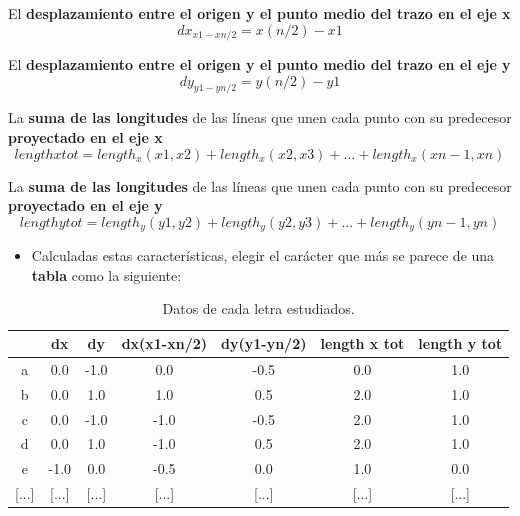 El \textbf{desplazamiento entre el origen y el punto medio del trazo en el eje x}
\begin{equation}
 dx_{x1-xn/2}=x(n/2)-x1
\end{equation}

El \textbf{desplazamiento entre el origen y el punto medio del trazo en el eje y}
\begin{equation}
dy _{y1-yn/2}=y(n/2)-y1
\end{equation}

La \textbf{suma de las longitudes} de las líneas que unen cada punto con su predecesor \textbf{proyectado en el eje x}
\begin{equation}
lengthxtot = length_x(x1,x2) + length_x(x2,x3) + ... + length_x(xn-1,xn)
\end{equation}

La \textbf{suma de las longitudes} de las líneas que unen cada punto con su predecesor \textbf{proyectado en el eje y}
\begin{equation}
lengthytot = length_y(y1,y2) + length_y(y2,y3) + ... + length_y(yn-1,yn)
\end{equation}


\begin{itemize}
 \item Calculadas estas características, elegir el carácter que más se parece de una \textbf{tabla} como la siguiente:
\end{itemize}

\begin{table}[hbtp]
\centering
\begin{tabular}{c|c|c|c|c|c|c|}
\cline{2-7}
\multicolumn{1}{l|}{}           & dx        & dy        & dx(x1-xn/2) & dy(y1-yn/2) & length x tot & length y tot \\ \hline
\multicolumn{1}{|c|}{a}         & 0.0       & -1.0      & 0.0         & -0.5        & 0.0          & 1.0          \\ \hline
\multicolumn{1}{|c|}{b}         & 0.0       & 1.0       & 1.0         & 0.5         & 2.0          & 1.0          \\ \hline
\multicolumn{1}{|c|}{c}         & 0.0       & -1.0      & -1.0        & -0.5        & 2.0          & 1.0          \\ \hline
\multicolumn{1}{|c|}{d}         & 0.0       & 1.0       & -1.0        & 0.5         & 2.0          & 1.0          \\ \hline
\multicolumn{1}{|c|}{e}         & -1.0      & 0.0       & -0.5        & 0.0         & 1.0          & 0.0          \\ \hline
\multicolumn{1}{|c|}{{[}...{]}} & {[}...{]} & {[}...{]} & {[}...{]}   & {[}...{]}   & {[}...{]}    & {[}...{]}    \\ \hline
\end{tabular}
\caption{Datos de cada letra estudiados.}
\label{table:tablepalm}
\end{table}

